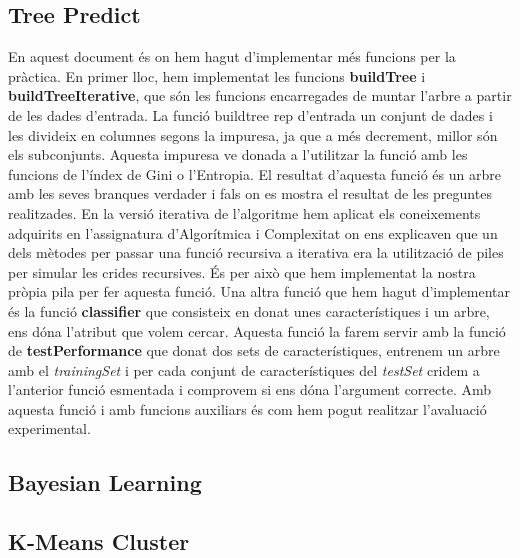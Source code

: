 \documentclass[11pt]{article}
\begin{document}
	\subsection{Tree Predict}
		En aquest document és on hem hagut d'implementar més funcions per la pràctica. En primer lloc, hem implementat les funcions \textbf{buildTree} i \textbf{buildTreeIterative}, que són les funcions encarregades de muntar l'arbre a partir de les dades d'entrada. La funció buildtree rep d'entrada un conjunt de dades i les divideix en columnes segons la impuresa, ja que a més decrement, millor són els subconjunts. Aquesta impuresa ve donada a l'utilitzar la funció amb les funcions de l'índex de Gini o l'Entropia. El resultat d'aquesta funció és un arbre amb les seves branques verdader i fals on es mostra el resultat de les preguntes realitzades. En la versió iterativa de l'algoritme hem aplicat els coneixements adquirits en l'assignatura d'Algorítmica i Complexitat on ens explicaven que un dels mètodes per passar una funció recursiva a iterativa era la utilització de piles per simular les crides recursives. És per això que hem implementat la nostra pròpia pila per fer aquesta funció. Una altra funció que hem hagut d'implementar és la funció \textbf{classifier} que consisteix en donat unes característiques i un arbre, ens dóna l'atribut que volem cercar. Aquesta funció la farem servir amb la funció de \textbf{testPerformance} que donat dos sets de característiques, entrenem un arbre amb el \textit{trainingSet} i per cada conjunt de característiques del \textit{testSet} cridem a l'anterior funció esmentada i comprovem si ens dóna l'argument correcte. Amb aquesta funció i amb funcions auxiliars és com hem pogut realitzar l'avaluació experimental.
		
	\subsection{Bayesian Learning}
		
	\subsection{K-Means Cluster}
\end{document}
